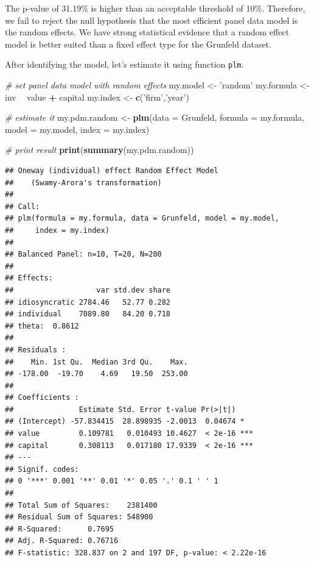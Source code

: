 \documentclass[11pt,]{book}
\newenvironment{Shaded}{\begin{snugshade}}{\end{snugshade}}
\newcommand{\KeywordTok}[1]{\textcolor[rgb]{0.27,0.27,0.27}{\textbf{#1}}}
\newcommand{\DataTypeTok}[1]{\textcolor[rgb]{0.27,0.27,0.27}{#1}}
\newcommand{\StringTok}[1]{\textcolor[rgb]{0.5,0.5,0.5}{#1}}
\newcommand{\CommentTok}[1]{\textcolor[rgb]{0.56,0.35,0.01}{\textit{#1}}}
\newcommand{\OperatorTok}[1]{\textcolor[rgb]{0.81,0.36,0.00}{\textbf{#1}}}
\newcommand{\NormalTok}[1]{#1}
\begin{document}
The p-value of 31.19\% is higher than an acceptable threshold of 10\%.
Therefore, we fail to reject the null hypothesis that the most efficient
panel data model is the random effects. We have strong statistical
evidence that a random effect model is better suited than a fixed effect
type for the Grunfeld dataset.

After identifying the model, let's estimate it using function
\texttt{plm}.

\begin{Shaded}
\begin{Highlighting}[]
\CommentTok{# set panel data model with random effects}
\NormalTok{my.model <-}\StringTok{ 'random'}
\NormalTok{my.formula <-}\StringTok{ }\NormalTok{inv }\OperatorTok{~}\StringTok{ }\NormalTok{value }\OperatorTok{+}\StringTok{ }\NormalTok{capital}
\NormalTok{my.index <-}\StringTok{ }\KeywordTok{c}\NormalTok{(}\StringTok{'firm'}\NormalTok{,}\StringTok{'year'}\NormalTok{)}

\CommentTok{# estimate it}
\NormalTok{my.pdm.random <-}\StringTok{ }\KeywordTok{plm}\NormalTok{(}\DataTypeTok{data =}\NormalTok{ Grunfeld, }
                     \DataTypeTok{formula =}\NormalTok{ my.formula, }
                     \DataTypeTok{model =}\NormalTok{ my.model,}
                     \DataTypeTok{index =}\NormalTok{ my.index)}

\CommentTok{# print result}
\KeywordTok{print}\NormalTok{(}\KeywordTok{summary}\NormalTok{(my.pdm.random))}
\end{Highlighting}
\end{Shaded}

\begin{verbatim}
## Oneway (individual) effect Random Effect Model 
##    (Swamy-Arora's transformation)
## 
## Call:
## plm(formula = my.formula, data = Grunfeld, model = my.model, 
##     index = my.index)
## 
## Balanced Panel: n=10, T=20, N=200
## 
## Effects:
##                   var std.dev share
## idiosyncratic 2784.46   52.77 0.282
## individual    7089.80   84.20 0.718
## theta:  0.8612  
## 
## Residuals :
##    Min. 1st Qu.  Median 3rd Qu.    Max. 
## -178.00  -19.70    4.69   19.50  253.00 
## 
## Coefficients :
##               Estimate Std. Error t-value Pr(>|t|)    
## (Intercept) -57.834415  28.898935 -2.0013  0.04674 *  
## value         0.109781   0.010493 10.4627  < 2e-16 ***
## capital       0.308113   0.017180 17.9339  < 2e-16 ***
## ---
## Signif. codes:  
## 0 '***' 0.001 '**' 0.01 '*' 0.05 '.' 0.1 ' ' 1
## 
## Total Sum of Squares:    2381400
## Residual Sum of Squares: 548900
## R-Squared:      0.7695
## Adj. R-Squared: 0.76716
## F-statistic: 328.837 on 2 and 197 DF, p-value: < 2.22e-16
\end{verbatim}
\end{document}
